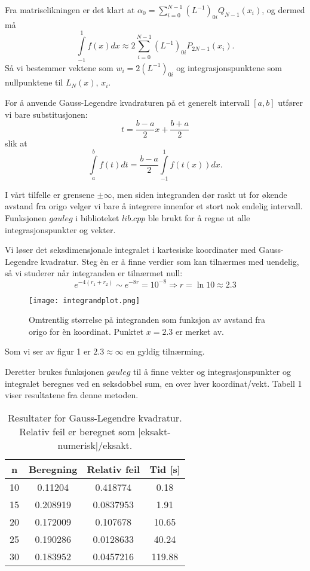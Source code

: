 \documentclass[norsk, 12pt]{article}
\newcommand{\f}{\frac}
\begin{document}
Fra matriselikningen er det klart at $\alpha_0 = \sum\limits_{i=0}^{N-1}(L^{-1})_{0i}Q_{N-1}(x_i)$, og dermed må
$$\int\limits_{-1}^1f(x)dx \approx 2\sum\limits_{i=0}^{N-1}(L^{-1})_{0i}P_{2N-1}(x_i).$$
Så vi bestemmer vektene som $w_i=2(L^{-1})_{0i}$ og integrasjonspunktene som nullpunktene til $L_N(x)$, $x_i$.

For å anvende Gauss-Legendre kvadraturen på et generelt intervall $[a,b]$ utfører vi bare substitusjonen:
$$t = \f{b-a}{2}x+\f{b+a}{2}$$ slik at
$$\int\limits_a^bf(t)dt = \f{b-a}{2}\int\limits_{-1}^1f(t(x))dx.$$

I vårt tilfelle er grensene $\pm\infty$, men siden integranden dør raskt ut for økende avstand fra origo velger vi bare
å integrere innenfor et stort nok endelig intervall. Funksjonen $gauleg$ i biblioteket $lib.cpp$ ble brukt for å regne
ut alle integrasjonspunkter og vekter.

Vi løser det seksdimensjonale integralet i kartesiske koordinater med Gauss-Legendre kvadratur. Steg èn er å finne
verdier som kan tilnærmes med uendelig, så vi studerer når integranden er tilnærmet null:
$$e^{-4(r_1+r_2)} \sim e^{-8r} = 10^{-8} \Rightarrow r = \ln10\approx2.3$$


\begin{figure}
 \centering
 \texttt{[image: integrandplot.png]}
 \caption{Omtrentlig størrelse på integranden som funksjon av avstand fra origo for èn koordinat.
 Punktet $x=2.3$ er merket av.}
\end{figure}

Som vi ser av figur 1 er $2.3\approx\infty$ en gyldig tilnærming. 

Deretter brukes funksjonen $gauleg$ til å finne vekter og integrasjonspunkter og integralet beregnes ved en
seksdobbel sum, en over hver koordinat/vekt.
Tabell 1 viser resultatene fra denne metoden.

\begin{table}
 \centering
 \begin{tabular}{|c|c|c|c|}\hline
 n &Beregning &Relativ feil &Tid [s] \\ \hline
 10      &0.11204       &0.418774      &0.18\\
 15      &0.208919      &0.0837953      &1.91\\
 20      &0.172009      &0.107678      &10.65\\
 25      &0.190286      &0.0128633      &40.24\\
 30      &0.183952      &0.0457216      &119.88\\ \hline
  
 \end{tabular}
\caption{Resultater for Gauss-Legendre kvadratur. Relativ feil er beregnet som |eksakt-numerisk|/eksakt.}
\end{table}
\end{document}
